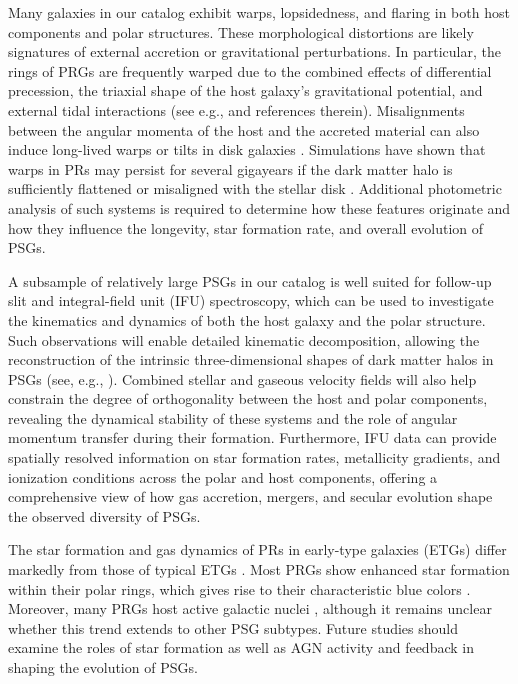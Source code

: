 \documentclass{aa}
\begin{document}
Many galaxies in our catalog exhibit warps, lopsidedness, and flaring in both host components and polar structures. These morphological distortions are likely signatures of external accretion or gravitational perturbations. In particular, the rings of PRGs are frequently warped due to the combined effects of differential precession, the triaxial shape of the host galaxy’s gravitational potential, and external tidal interactions (see e.g., \citealt{2006EAS....20...97C} and references therein). Misalignments between the angular momenta of the host and the accreted material can also induce long-lived warps or tilts in disk galaxies \citep{2010MNRAS.408..783R}. Simulations have shown that warps in PRs may persist for several gigayears if the dark matter halo is sufficiently flattened or misaligned with the stellar disk \citep{2003A&A...401..817B}. Additional photometric analysis of such systems is required to determine how these features originate and how they influence the longevity, star formation rate, and overall evolution of PSGs.

A subsample of relatively large PSGs in our catalog is well suited for follow-up slit and integral-field unit (IFU) spectroscopy, which can be used to investigate the kinematics and dynamics of both the host galaxy and the polar structure. Such observations will enable detailed kinematic decomposition, allowing the reconstruction of the intrinsic three-dimensional shapes of dark matter halos in PSGs (see, e.g., \citealt{2014MNRAS.441.2650K}). Combined stellar and gaseous velocity fields will also help constrain the degree of orthogonality between the host and polar components, revealing the dynamical stability of these systems and the role of angular momentum transfer during their formation. Furthermore, IFU data can provide spatially resolved information on star formation rates, metallicity gradients, and ionization conditions across the polar and host components, offering a comprehensive view of how gas accretion, mergers, and secular evolution shape the observed diversity of PSGs.

The star formation and gas dynamics of PRs in early-type galaxies (ETGs) differ markedly from those of typical ETGs \citep{2015MNRAS.447.2287R,2019MNRAS.486.4186E,2024Galax..12...42L}. Most PRGs show enhanced star formation within their polar rings, which gives rise to their characteristic blue colors \citep{1999ASPC..163..197E}. Moreover, many PRGs host active galactic nuclei \citep{2020AstL...46..501S}, although it remains unclear whether this trend extends to other PSG subtypes. Future studies should examine the roles of star formation as well as AGN activity and feedback in shaping the evolution of PSGs.
\end{document}
